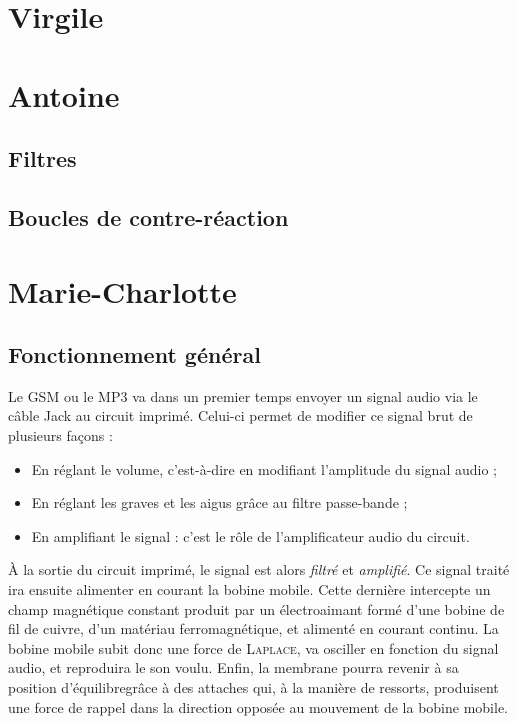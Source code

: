 \documentclass{article}
\begin{document}
\section{Virgile}

\section{Antoine}
\subsection{Filtres}

\subsection{Boucles de contre-réaction}

\section{Marie-Charlotte}
\subsection{Fonctionnement général}

Le GSM ou le MP3 va dans un premier temps envoyer un signal audio via le câble Jack au circuit imprimé. Celui-ci permet
de modifier ce signal brut de plusieurs façons :

\begin{itemize}
	\item En réglant le volume, c'est-à-dire en modifiant l'amplitude du signal audio ;
	\item En réglant les graves et les aigus grâce au filtre passe-bande ;
	\item En amplifiant le signal : c'est le rôle de l'amplificateur audio du circuit.
\end{itemize}

À la sortie du circuit imprimé, le signal est alors \textit{filtré} et \textit{amplifié}.
Ce signal traité ira ensuite alimenter en courant la bobine mobile. Cette dernière intercepte un champ magnétique constant 
produit par un électroaimant formé d'une bobine de fil de cuivre, d'un matériau ferromagnétique, et alimenté en courant continu.
La bobine mobile subit donc une force de \textsc{Laplace}, va osciller en fonction du  signal audio, et reproduira le son voulu.
Enfin, la membrane pourra revenir à sa position d'équilibregrâce à des attaches qui, à la manière de ressorts, produisent une
force de rappel dans la direction opposée au mouvement de la bobine mobile. 
\end{document}
